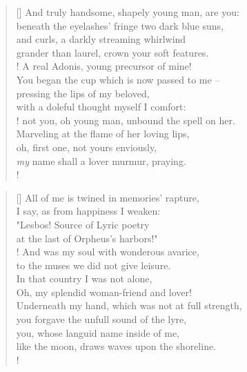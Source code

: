 \documentclass[]{article}
\newcommand{\poemauthorcenter}[1]{\nopagebreak{\centering\footnotesize\textsc{#1}\par}}
\begin{document}
\vspace*{0.05\textheight}
\settowidth{\versewidth}{with a doleful thought myself i comfort .       }
\begin{verse}[\versewidth]
And truly handsome, shapely young man, are you:\\
beneath the eyelashes' fringe two dark blue suns,\\
and curls, a darkly streaming whirlwind\\
grander than laurel, crown your soft features.\\!
A real Adonis, young precursor of mine!\\
You began the cup which is now passed to me --\\
pressing the lips of my beloved,\\
with a doleful thought myself I comfort:\\!
not you, oh young man, unbound the spell on her.\\
Marveling at the flame of her loving lips,\\
oh, first one, not yours enviously,\\
\textit{my} name shall a lover murmur, praying.\\!
\end{verse}
\poemauthorcenter{\textit{October 3rd, 1915}}
\bigskip \bigskip

\settowidth{\versewidth}{Waves do not always make easier sailing}
\begin{verse}[\versewidth]
All of me is twined in memories' rapture,\\
I say, as from happiness I weaken:\\
"Lesbos! Source of Lyric poetry\\
at the last of Orpheus's harbors!"\\!
And was my soul with wonderous avarice,\\
to the muses we did not give leisure.\\
In that country I was not alone,\\
Oh, my splendid woman-friend and lover!\\
Underneath my hand, which was not at full strength,\\
you forgave the unfull sound of the lyre,\\
you, whose languid name inside of me,\\
like the moon, draws waves upon the shoreline.\\!
\end{verse}
\poemauthorcenter{\textit{1922}}
\newpage
\end{document}
